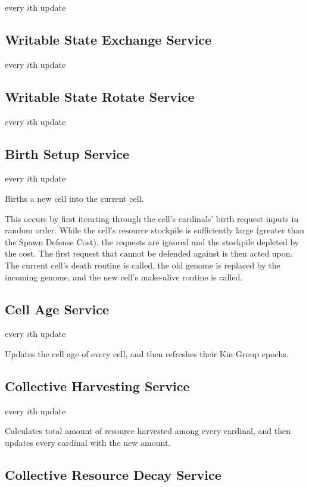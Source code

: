 every $i$th update

\subsection{Writable State Exchange Service}

every $i$th update

\subsection{Writable State Rotate Service}

every $i$th update

\subsection{Birth Setup Service}

every $i$th update

Births a new cell into the current cell.

This occurs by first iterating through the cell's cardinals' birth request inputs in random order.
While the cell's resource stockpile is sufficiently large (greater than the Spawn Defense Cost), the requests are ignored and the stockpile depleted by the cost.
The first request that cannot be defended against is then acted upon.
The current cell's death routine is called, the old genome is replaced by the incoming genome, and the new cell's make-alive routine is called.

\subsection{Cell Age Service}

every $i$th update

Updates the cell age of every cell, and then refreshes their Kin Group epochs.

\subsection{Collective Harvesting Service}

every $i$th update

Calculates total amount of resource harvested among every cardinal, and then updates every cardinal with the new amount.

\subsection{Collective Resource Decay Service}

